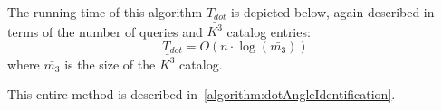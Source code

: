 %

The running time of this algorithm $T_{dot}$ is depicted below, again described in terms of the number of queries
and $\bar{K^3}$ catalog entries:
\begin{equation}\label{eq:dotComplexity}
    T_{dot} = O\left( n \cdot \log(\bar{m_3}) \right)
\end{equation}
where $\bar{m_3}$ is the size of the $\bar{K^3}$ catalog.

This entire method is described in~\autoref{algorithm:dotAngleIdentification}.


